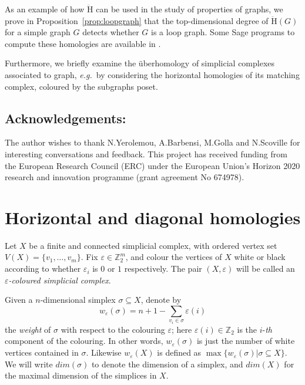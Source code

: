 \documentclass[11pt, a4paper, reqno, twoside, makeidx]{amsart}
\theoremstyle{remark}
\theoremstyle{plain}
\theoremstyle{definition}
\newcommand{\Z}{\mathbb{Z}}
\newcommand{\uH}{\ddot{\mathrm{H}}}
\begin{document}
As an example of how $\uH$ can be used in the study of properties of graphs, we prove in Proposition~\ref{prop:loopgraph} that the top-dimensional degree of $\uH(G)$ for a simple graph $G$ detects whether $G$ is a loop graph. Some Sage \cite{sagemath} programs to compute these homologies are available in \cite{miogithub}.

Furthermore, we briefly examine the \"uberhomology of simplicial complexes associated to graph, \emph{e.g.}~by considering the horizontal homologies of its matching complex, coloured by the subgraphs poset. 






\subsection*{Acknowledgements:} The author wishes to thank  N.Yerolemou, A.Barbensi, M.Golla and N.Scoville for interesting conversations and feedback. This project has received funding from the European Research Council (ERC) under the European Union’s Horizon 2020 research and innovation programme (grant agreement No 674978).















\section{Horizontal and diagonal homologies}

Let $X$ be a finite and connected simplicial complex, with ordered vertex set $V(X) = \{v_1, \ldots, v_m\}$. Fix $\varepsilon \in \Z_2^m$, and colour the vertices of $X$ white or black according to whether $\varepsilon_i$ is $0$ or $1$ respectively. The pair $(X,\varepsilon)$ will be called an \emph{$\varepsilon$-coloured simplicial complex}. 

Given a $n$-dimensional simplex $\sigma \subseteq X$, denote by $$ w_\varepsilon(\sigma) = n+1-\sum_{v_i \in \sigma} \varepsilon(i)$$  the \emph{weight} of $\sigma$ with respect to the colouring $\varepsilon$; here $\varepsilon(i) \in \Z_2$ is the $i$-\emph{th} component of the colouring. In other words, $w_\varepsilon (\sigma)$ is just the number of white vertices contained in $\sigma$. Likewise $w_\varepsilon (X)$ is defined as $\max\{w_\varepsilon(\sigma)|\sigma \subseteq X\}$.  We will write $dim(\sigma)$ to denote the dimension of a simplex, and $dim(X)$ for the maximal dimension of the simplices in $X$.
\end{document}
